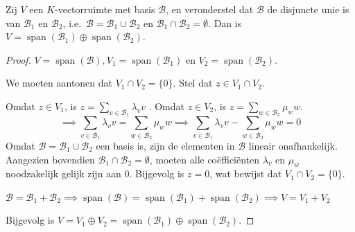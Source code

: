 \begin{stelling}[2.5.5]
    Zij $V$ een $K$-vectorruimte met basis $\mathcal{B}$,
    en veronderstel dat $\mathcal{B}$ de disjuncte unie is van $\mathcal{B}_1$ en $\mathcal{B}_2$,
    i.e.\ $\mathcal{B} = \mathcal{B}_1 \cup \mathcal{B}_2$ en $\mathcal{B}_1 \cap \mathcal{B}_2 = \emptyset$.
    Dan is $V = \operatorname{span}(\mathcal{B}_1) \oplus \operatorname{span}(\mathcal{B}_2)$.
\end{stelling}
\begin{proof}
    \(V = \operatorname{span}(\mathcal{B}), V_1 = \operatorname{span}(\mathcal{B}_1) \) en \(V_2 = \operatorname{span}(\mathcal{B}_2)\).

    We moeten aantonen dat $V_1 \cap V_2 = \{0\}$.
    Stel dat $z \in V_1 \cap V_2$.

    Omdat $z \in V_1$, is $z = \sum_{v \in \mathcal{B}_1} \lambda_v v$ .
    Omdat $z \in V_2$, is $z = \sum_{w \in \mathcal{B}_2} \mu_w w$.
    \[\implies \sum_{v \in \mathcal{B}_1} \lambda_v v = \sum_{w \in \mathcal{B}_2} \mu_w w \implies \sum_{v \in \mathcal{B}_1} \lambda_v v - \sum_{w \in \mathcal{B}_2} \mu_w w = 0 \]
    Omdat $\mathcal{B} = \mathcal{B}_1 \cup \mathcal{B}_2$ een basis is, zijn de elementen in $\mathcal{B}$ lineair onafhankelijk.
     Aangezien bovendien $\mathcal{B}_1 \cap \mathcal{B}_2 = \emptyset$,
    moeten alle coëfficiënten $\lambda_v$ en $\mu_w$ noodzakelijk gelijk zijn aan 0.
    Bijgevolg is $z = 0$, wat bewijst dat $V_1 \cap V_2 = \{0\}$.

    \(\mathcal{B} = \mathcal{B}_1 + \mathcal{B}_2 \implies
     \operatorname{span} (\mathcal{B})= \operatorname{span} (\mathcal{B}_1) + \operatorname{span}(\mathcal{B}_2)
     \implies V = V_1 + V_2 \)

     Bijgevolg is \(V = V_1 \oplus V_2 = \operatorname{span} (\mathcal{B}_1) \oplus \operatorname{span}(\mathcal{B}_2) \).
\end{proof}

